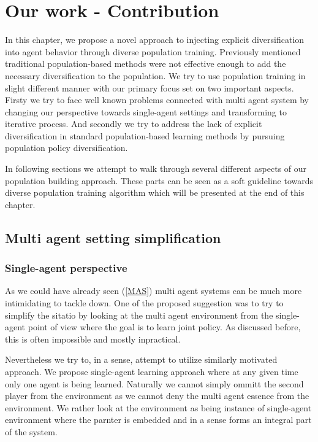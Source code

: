 \chapter{Our work - Contribution}
In this chapter, we propose a novel approach to injecting explicit diversification into agent behavior through diverse population training.
Previously mentioned traditional population-based methods were not effective enough to add the necessary diversification to the population.
We try to use population training in slight different manner with our primary focus set on two important aspects.
Firsty we try to face well known problems connected with multi agent system by changing our perspective towards single-agent settings and transforming to iterative process.
And secondly we try to address the lack of explicit diversification in standard population-based learning methods by pursuing population policy diversification. 

In following sections we attempt to walk through several different aspects of our population building approach.
These parts can be seen as a soft guideline towards diverse population training algorithm which will be presented at the end of this chapter.

\section{Multi agent setting simplification}

\subsection{Single-agent perspective}
As we could have already seen (\ref{MAS}) multi agent systems can be much more intimidating to tackle down.
One of the proposed suggestion was to try to simplify the sitatio by looking at the multi agent environment from the single-agent point of view where the goal is to learn joint policy.
As discussed before, this is often impossible and mostly inpractical.

Nevertheless we try to, in a sense, attempt to utilize similarly motivated approach.
We propose single-agent learning approach where at any given time only one agent is being learned.
Naturally we cannot simply ommitt the second player from the environment as we cannot deny the multi agent essence from the environment.
We rather look at the environment as being instance of single-agent environment where the parnter is embedded and in a sense forms an integral part of the system.

